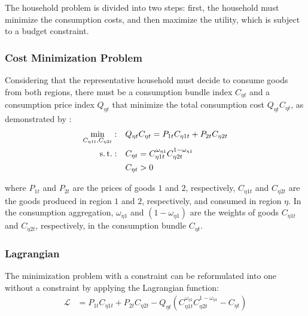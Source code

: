 \documentclass[../thesis.tex]{subfiles}
\begin{document}

The household problem is divided into two steps: first, the household must minimize the consumption costs, and then maximize the utility, which is subject to a budget constraint.

\subsubsection*{Cost Minimization Problem}

Considering that the representative household must decide to consume goods from both regions, there must be a consumption bundle index $C_{\eta t}$ and a consumption price index $Q_{\eta t}$ that minimize the total consumption cost $Q_{\eta t} C_{\eta t}$, as demonstrated by \textcite[p.424]{walsh_monetary_2017}:
	\begin{align}
		\min_{C_{\eta 1 t}, C_{\eta 2 t}}: &\quad Q_{\eta t} C_{\eta t} = P_{1 t} C_{\eta 1t} + P_{2 t} C_{\eta 2t} \label{eq_v2:reg-consumption-cost}
		\\
		\operatorname{s.t.}: &\quad C_{\eta t} = C_{\eta 1 t}^{\omega_{\eta 1}} C_{\eta 2 t}^{1-\omega_{\eta 1}} \label{eq_v2:reg-consumption-aggregation} \\
		&\quad C_{\eta t} > 0 \nonumber
	\end{align}

	where $P_{1t}$ and $P_{2t}$ are the prices of goods $1$ and $2$, respectively, $C_{\eta 1 t}$ and $C_{\eta 2 t}$ are the goods produced in region $1$ and $2$, respectively, and consumed in region $\eta$. In the consumption aggregation, ${\omega_{\eta 1}}$ and $({1 - \omega_{\eta 1}})$ are the weights of goods $C_{\eta 1 t}$ and $C_{\eta 2 t}$, respectively, in the consumption bundle $C_{\eta t}$.

\subsubsection*{Lagrangian}


The minimization problem with a constraint can be reformulated into one without a constraint by applying the Lagrangian function:
	\begin{align}
		\mathcal{L} &= P_{1 t} C_{\eta 1t} + P_{2 t} C_{\eta 2t} - Q_{\eta t} (C_{\eta 1 t}^{\omega_{\eta 1}} C_{\eta 2 t}^{1-\omega_{\eta 1}} - C_{\eta t}) \label{eq_v2:reg-consumption-lagrangian}
	\end{align}
\end{document}
